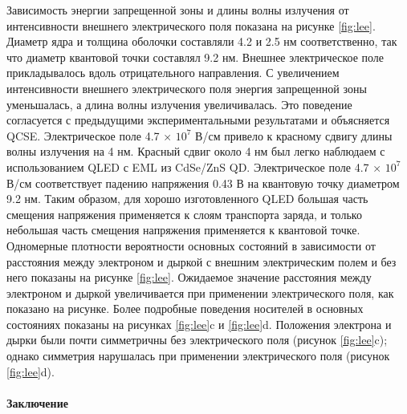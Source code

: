 \documentclass[a4paper,14pt]{extarticle}
\begin{document}
Зависимость энергии запрещенной зоны и длины волны излучения от интенсивности внешнего электрического поля показана на рисунке \ref{fig:lee}. Диаметр ядра и толщина оболочки составляли 4.2 и 2.5 нм соответственно, так что диаметр квантовой точки составлял 9.2 нм. Внешнее электрическое поле прикладывалось вдоль отрицательного направления. С увеличением интенсивности внешнего электрического поля энергия запрещенной зоны уменьшалась, а длина волны излучения увеличивалась. Это поведение согласуется с предыдущими экспериментальными результатами и объясняется QCSE. Электрическое поле 4.7 × $10^7$ В/см привело к красному сдвигу длины волны излучения на 4 нм. Красный сдвиг около 4 нм был легко наблюдаем с использованием QLED с EML из CdSe/ZnS QD. Электрическое поле 4.7 × $10^7$ В/см соответствует падению напряжения 0.43 В на квантовую точку диаметром 9.2 нм. Таким образом, для хорошо изготовленного QLED большая часть смещения напряжения применяется к слоям транспорта заряда, и только небольшая часть смещения напряжения применяется к квантовой точке. Одномерные плотности вероятности основных состояний в зависимости от расстояния между электроном и дыркой с внешним электрическим полем и без него показаны на рисунке \ref{fig:lee}. Ожидаемое значение расстояния между электроном и дыркой увеличивается при применении электрического поля, как показано на рисунке. Более подробные поведения носителей в основных состояниях показаны на рисунках \ref{fig:lee}c и \ref{fig:lee}d. Положения электрона и дырки были почти симметричны без электрического поля (рисунок \ref{fig:lee}c); однако симметрия нарушалась при применении электрического поля (рисунок \ref{fig:lee}d).

\paragraph{Заключение}
\end{document}
